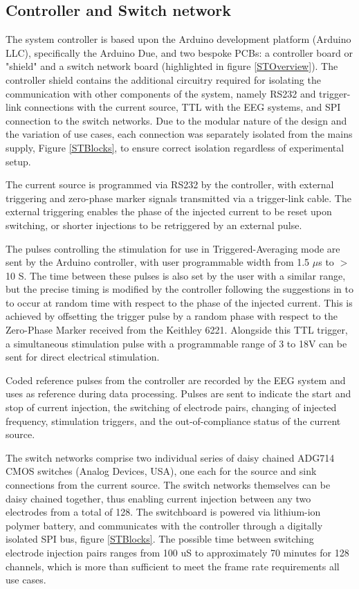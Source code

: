 \subsection{Controller and Switch network}

The system controller is based upon the Arduino development platform (Arduino LLC), specifically the Arduino Due, and two bespoke PCBs: a controller board or "shield" and a switch network board (highlighted in figure \ref{STOverview}). The controller shield contains the additional circuitry required for isolating the communication with other components of the system, namely RS232 and trigger-link connections with the current source, TTL with the EEG systems, and SPI connection to the switch networks. Due to the modular nature of the design and the variation of use cases, each connection was separately isolated from the mains supply, Figure \ref{STBlocks}, to ensure correct isolation regardless of experimental setup.

The current source is programmed via RS232 by the controller, with external triggering and zero-phase marker signals transmitted via a trigger-link cable. The external triggering enables the phase of the injected current to be reset upon switching, or shorter injections to be retriggered by an external pulse. 

The pulses controlling the stimulation for use in Triggered-Averaging mode are sent by the Arduino controller, with user programmable width from 1.5 $\mu$s to $>$ 10 S. The time between these pulses is also set by the user with a similar range, but the precise timing is modified by the controller following the suggestions in \cite{Aristovich_2015} to to occur at random time with respect to the phase of the injected current. This is achieved by offsetting the trigger pulse by a random phase with respect to the Zero-Phase Marker received from the Keithley 6221. Alongside this TTL trigger, a simultaneous stimulation pulse with a programmable range of 3 to 18V can be sent for direct electrical stimulation.

Coded reference pulses from the controller are recorded by the EEG system and uses as reference during data processing. Pulses are sent to indicate the start and stop of current injection, the switching of electrode pairs, changing of injected frequency, stimulation triggers, and the out-of-compliance status of the current source. 

The switch networks comprise two individual series of daisy chained ADG714 CMOS switches (Analog Devices, USA), one each for the source and sink connections from the current source. The switch networks themselves can be daisy chained together, thus enabling current injection between any two electrodes from a total of 128. The switchboard is powered via lithium-ion polymer battery, and communicates with the controller through a digitally isolated SPI bus, figure \ref{STBlocks}. The possible time between switching electrode injection pairs ranges from 100 uS to approximately 70 minutes for 128 channels, which is more than sufficient to meet the frame rate requirements all use cases. 